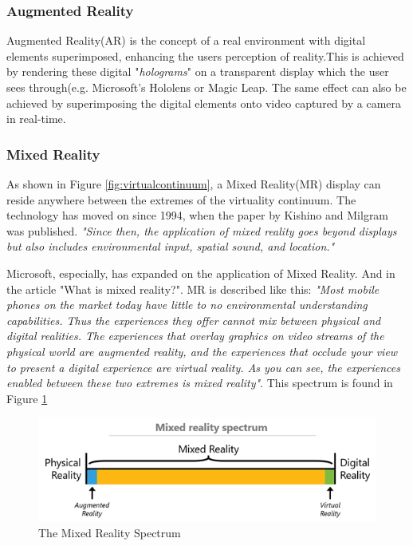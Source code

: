    \subsubsection{Augmented Reality}
    Augmented Reality(AR) is the concept of a real environment with digital elements superimposed, enhancing the users perception of reality.This is achieved by rendering these digital "\emph{holograms}"\cite{wdc-holo} on a transparent display which the user sees through(e.g. Microsoft's Hololens or Magic Leap. The same effect can also be achieved by superimposing the digital elements onto video captured by a camera in real-time.
    
    \subsubsection{Mixed Reality}
    As shown in Figure \ref{fig:virtualcontinuum}, a Mixed Reality(MR) display can reside anywhere between the extremes of the virtuality continuum\cite{Milgram1994}. The technology has moved on since 1994, when the paper by Kishino and Milgram was published. \emph{"Since then, the application of mixed reality goes beyond displays but also includes environmental input, spatial sound, and location."}\cite{wdc-mr}
    
    Microsoft, especially, has expanded on the application of Mixed Reality. And in the article "What is mixed reality?"\cite{wdc-mr}. MR is described like this: \emph{"Most mobile phones on the market today have little to no environmental understanding capabilities. Thus the experiences they offer cannot mix between physical and digital realities. The experiences that overlay graphics on video streams of the physical world are augmented reality, and the experiences that occlude your view to present a digital experience are virtual reality. As you can see, the experiences enabled between these two extremes is mixed reality"}\cite{wdc-mr}. This spectrum is found in Figure \ref{fig:mrspectrum}
    
    \begin{figure}[h!]
        \centering
        \includegraphics[scale=1]{figures/mixedrealityspectrum.png}
        \caption{The Mixed Reality Spectrum\cite{wdc-mr}}
        \label{fig:mrspectrum}
    \end{figure}
    

